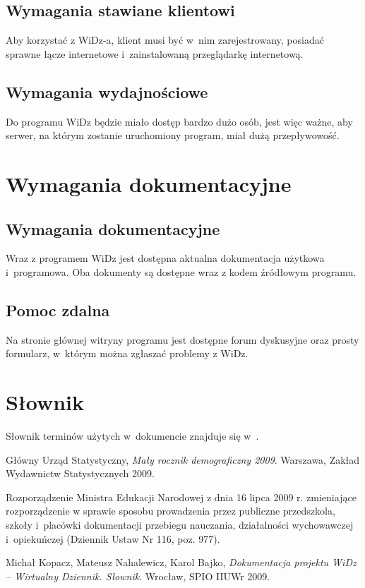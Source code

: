 \documentclass[12pt,leqno,twoside]{mwart}
\begin{document}
\subsection{Wymagania stawiane klientowi}
\noindent Aby korzystać z WiDz-a, klient musi być w~nim zarejestrowany, posiadać sprawne łącze internetowe i~zainstalowaną przeglądarkę internetową.

\subsection{Wymagania wydajnościowe}
\noindent Do programu WiDz będzie miało dostęp bardzo dużo osób, jest więc ważne, aby serwer, na którym zostanie uruchomiony program, miał dużą przepływowość.
 
\section{Wymagania dokumentacyjne}
\subsection{Wymagania dokumentacyjne}
\noindent Wraz z programem WiDz jest dostępna aktualna dokumentacja użytkowa i~programowa. Oba dokumenty są dostępne wraz z kodem źródłowym programu.
\subsection{Pomoc zdalna}
\noindent Na stronie głównej witryny programu jest dostępne forum dyskusyjne oraz prosty formularz, w~którym można zgłaszać problemy z WiDz.


\section{Słownik}
\noindent Słownik terminów użytych w~dokumencie znajduje się w~\cite{SLO}.

\begin{thebibliography}{99}
 Główny Urząd Statystyczny, {\it Mały rocznik demograficzny 2009}. Warszawa, Zakład Wydawnictw Statystycznych 2009.

 Rozporządzenie Ministra Edukacji Narodowej z dnia 16 lipca 2009 r. zmieniające rozporządzenie w sprawie sposobu prowadzenia przez publiczne przedszkola, szkoły i~placówki dokumentacji przebiegu nauczania, działalności 	wychowawczej i~opiekuńczej (Dziennik Ustaw Nr 116, poz. 977).

 Michał Kopacz, Mateusz Nahalewicz, Karol Bajko, {\it Dokumentacja projektu WiDz -- Wirtualny Dziennik. Słownik}. Wrocław, SPIO IIUWr 2009.
\end{thebibliography}
\end{document}

